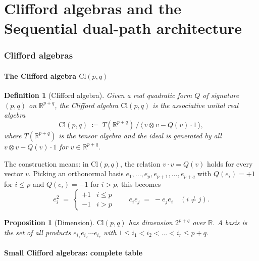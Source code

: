 \documentclass[11pt,a4paper]{article}
\newtheorem{definition}[theorem]{Definition}
\newtheorem{proposition}[theorem]{Proposition}
\theoremstyle{remark}
\newcommand{\R}{\mathbb{R}}
\newcommand{\Cl}[2]{\mathrm{Cl}(#1, #2)}
\begin{document}
\bigskip
\part{Clifford algebras and the Sequential dual-path architecture}

\section{Clifford algebras}\label{sec:clifford}

\subsection{The Clifford algebra $\Cl{p}{q}$}

\begin{definition}[Clifford algebra]
Given a real quadratic form $Q$ of signature $(p, q)$ on $\R^{p+q}$,
the \emph{Clifford algebra} $\Cl{p}{q}$ is the associative unital
real algebra
\[
  \Cl{p}{q} \;\coloneqq\; T(\R^{p+q}) \,/\, \langle\, v \otimes v - Q(v) \cdot 1 \,\rangle,
\]
where $T(\R^{p+q})$ is the tensor algebra and the ideal is
generated by all $v \otimes v - Q(v) \cdot 1$ for $v \in \R^{p+q}$.
\end{definition}

The construction means: in $\Cl{p}{q}$, the relation $v \cdot v =
Q(v)$ holds for every vector $v$. Picking an orthonormal basis
$e_1, \dots, e_p, e_{p+1}, \dots, e_{p+q}$ with
$Q(e_i) = +1$ for $i \leq p$ and $Q(e_i) = -1$ for $i > p$, this
becomes
\[
  e_i^2 \;=\; \begin{cases} +1 & i \leq p \\ -1 & i > p \end{cases}
  \qquad
  e_i e_j \;=\; -e_j e_i \quad (i \neq j).
\]

\begin{proposition}[Dimension]
$\Cl{p}{q}$ has dimension $2^{p+q}$ over $\R$. A basis is the set
of all products $e_{i_1} e_{i_2} \cdots e_{i_r}$ with
$1 \leq i_1 < i_2 < \dots < i_r \leq p + q$.
\end{proposition}

\subsection{Small Clifford algebras: complete table}
\end{document}
